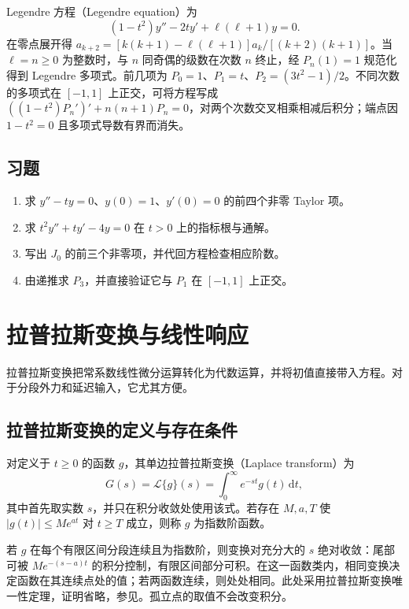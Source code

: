 \documentclass[UTF8,12pt,a4paper,fontset=fandol]{ctexbook}
\begin{document}
Legendre 方程（Legendre equation）为
\[
 (1-t^2)y''-2ty'+\ell(\ell+1)y=0.
\]
在零点展开得 $a_{k+2}=[k(k+1)-\ell(\ell+1)]a_k/[(k+2)(k+1)]$。当 $\ell=n\geq0$ 为整数时，与 $n$ 同奇偶的级数在次数 $n$ 终止，经 $P_n(1)=1$ 规范化得到 Legendre 多项式。前几项为 $P_0=1$、$P_1=t$、$P_2=(3t^2-1)/2$。不同次数的多项式在 $[-1,1]$ 上正交，可将方程写成 $((1-t^2)P_n')'+n(n+1)P_n=0$，对两个次数交叉相乘相减后积分；端点因 $1-t^2=0$ 且多项式导数有界而消失。

\section{习题}
\begin{enumerate}
 \item\label{ex:ode-airy} 求 $y''-ty=0$、$y(0)=1$、$y'(0)=0$ 的前四个非零 Taylor 项。
 \item\label{ex:ode-frobenius} 求 $t^2y''+ty'-4y=0$ 在 $t>0$ 上的指标根与通解。
 \item 写出 $J_0$ 的前三个非零项，并代回方程检查相应阶数。
 \item 由递推求 $P_3$，并直接验证它与 $P_1$ 在 $[-1,1]$ 上正交。
\end{enumerate}

\chapter{拉普拉斯变换与线性响应}
\label{chap:ode-laplace}

拉普拉斯变换把常系数线性微分运算转化为代数运算，并将初值直接带入方程。对于分段外力和延迟输入，它尤其方便。

\section{拉普拉斯变换的定义与存在条件}
\begin{definition}
对定义于 $t\geq0$ 的函数 $g$，其单边拉普拉斯变换（Laplace transform）为
\[
 G(s)=\mathcal L\{g\}(s)=\int_0^\infty e^{-st}g(t)\,\mathrm dt,
\]
其中首先取实数 $s$，并只在积分收敛处使用该式。若存在 $M,a,T$ 使 $|g(t)|\leq Me^{at}$ 对 $t\geq T$ 成立，则称 $g$ 为指数阶函数。
\end{definition}

若 $g$ 在每个有限区间分段连续且为指数阶，则变换对充分大的 $s$ 绝对收敛：尾部可被 $Me^{-(s-a)t}$ 的积分控制，有限区间部分可积。在这一函数类内，相同变换决定函数在其连续点处的值；若两函数连续，则处处相同。此处采用拉普拉斯变换唯一性定理，证明省略，参见\cite[第6章]{lebl-diffyqs}。孤立点的取值不会改变积分。
\end{document}

